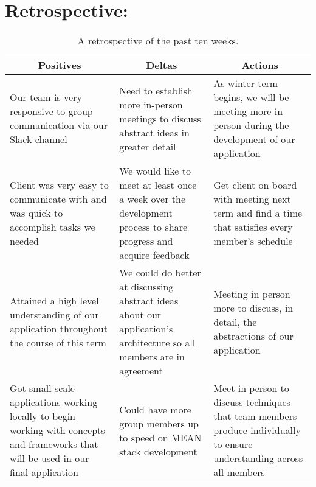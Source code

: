 \documentclass[journal,10pt,onecolumn,compsoc]{IEEEtran} \usepackage[margin=1.0in]{geometry} \usepackage{pdfpages}
\begin{document}
    \section{Retrospective:}
    
    \begin{table}[H]
    \begin{center}
     \begin{tabular}{ |p{}|p{}|p{}|} 
     \hline
     \multicolumn{1}{|c|}{\textbf{Positives}} 
     & 
    \multicolumn{1}{|c|}{\textbf{Deltas}}  & 
    \multicolumn{1}{|c|}{\textbf{Actions}}\\
     \hline
     
    Our team is very responsive to group communication via our Slack channel & Need to establish more in-person meetings to discuss abstract ideas in greater detail & As winter term begins, we will be meeting more in person during the development of our application \\
     \hline
     
    Client was very easy to communicate with and was quick to accomplish tasks we needed & We would like to meet at least once a week over the development process to share progress and acquire feedback & Get client on board with meeting next term and find a time that satisfies every member's schedule\\
     \hline
     
    Attained a high level understanding of our application throughout the course of this term & We could do better at discussing abstract ideas about our application's architecture so all members are in agreement & Meeting in person more to discuss, in detail, the abstractions of our application\\
     \hline
     
    Got small-scale applications working locally to begin working with concepts and frameworks that will be used in our final application & Could have more group members up to speed on MEAN stack development & Meet in person to discuss techniques that team members produce individually to ensure understanding across all members\\
     \hline
    \end{tabular}
    \caption{A retrospective of the past ten weeks.}
    \label{table:1}
    \end{center}
    \end{table}
    \newpage
\end{document}
